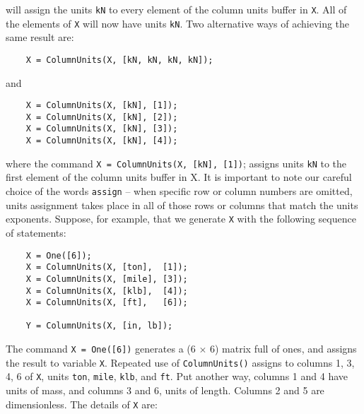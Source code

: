 \vspace{0.15 in}\noindent
will assign the units {\tt kN} to every element of the column units buffer in {\tt X}. 
All of the elements of {\tt X} will now have units {\tt kN}.
Two alternative ways of achieving the same result are:

\begin{footnotesize}
\begin{verbatim}
    X = ColumnUnits(X, [kN, kN, kN, kN]);
\end{verbatim}
\end{footnotesize}

\vspace{0.05 in}\noindent
and 

\begin{footnotesize}
\begin{verbatim}
    X = ColumnUnits(X, [kN], [1]);
    X = ColumnUnits(X, [kN], [2]);
    X = ColumnUnits(X, [kN], [3]);
    X = ColumnUnits(X, [kN], [4]);
\end{verbatim}
\end{footnotesize}

\vspace{0.15 in}\noindent
where the command {\tt X = ColumnUnits(X, [kN], [1])}; assigns units
{\tt kN} to the first element of the column units buffer in X.
It is important to note our careful choice of the words {\tt assign} --
when specific row or column numbers are omitted,
units assignment takes place in all of those rows or columns that
match the units exponents.
Suppose, for example, that we generate {\tt X} with
the following sequence of statements:

\begin{footnotesize}
\begin{verbatim}
    X = One([6]);
    X = ColumnUnits(X, [ton],  [1]);
    X = ColumnUnits(X, [mile], [3]);
    X = ColumnUnits(X, [klb],  [4]);
    X = ColumnUnits(X, [ft],   [6]);

    Y = ColumnUnits(X, [in, lb]);
\end{verbatim}
\end{footnotesize}

\vspace{0.15 in}\noindent
The command {\tt X = One([6])} generates a (6 $\times$ 6) matrix full of ones,
and assigns the result to variable {\tt X}. Repeated use
of {\tt ColumnUnits()} assigns to columns 1, 3, 4, 6 of {\tt X},
units {\tt ton}, {\tt mile}, {\tt klb}, and {\tt ft}.
Put another way, columns 1 and 4 have units of mass,
and columns 3 and 6, units of length. Columns 2 and 5 are dimensionless.
The details of {\tt X} are:

